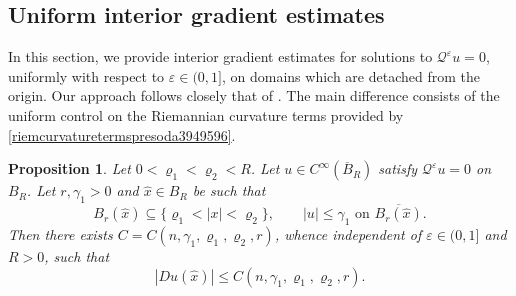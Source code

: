 \documentclass[11pt]{amsart}
\renewcommand{\leq}{\leqslant}
\renewcommand{\le}{<}
\renewcommand{\ge}{>}
\newcommand{\eps}{\varepsilon}
\newcommand{\Qe}{\mathcal Q^\eps}
\newtheorem{proposition}[theorem]{Proposition}
\theoremstyle{definition}
\theoremstyle{remark}
\numberwithin{equation}{section}
\begin{document}
\subsection{Uniform interior gradient estimates}
In this section, we provide interior gradient estimates for solutions to $\Qe u=0$, uniformly with respect to $\eps\in(0,1]$, on domains which are detached from the origin. Our approach follows closely that of \cite[Theorem 1.2]{MR5029815}. The main difference consists of the uniform control on the Riemannian curvature terms provided by \eqref{riemcurvaturetermspresoda3949596}.
\begin{proposition}\label{thm_uniform_gradient}
Let $0\le\varrho_1\le\varrho_2\le R$.   Let $u\in C^\infty(\overline B_R)$ satisfy $\Qe u=0$ on $B_R$.
Let $r,\gamma_1\ge 0$ and $\hat x\in B_R$ be such that
\begin{equation*}\label{gamma_1_bound}
 B_r(\hat x)\subseteq \{\varrho_1\le|x|\le\varrho_2\},\qquad |u|\leq\gamma_1\text{ on $\overline { B_r(\hat x)}$}.
\end{equation*}
Then there exists $C=C(n,\gamma_1,\varrho_1,\varrho_2,r)$, whence independent of $\eps\in(0,1]$ and $R\ge 0$, such that 
\begin{equation}\label{eq_ug_estimate}
 |Du(\hat x)|\leq C(n,\gamma_1,\varrho_1,\varrho_2,r).
\end{equation}
\end{proposition}
\end{document}
